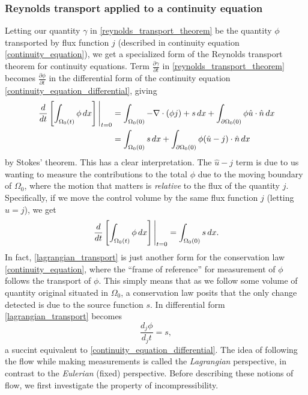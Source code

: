\documentclass[11pt,a4paper]{memoir}
\newcommand{\Part}[2]{\frac{\partial #1}{\partial #2}}
\begin{document}
\subsubsection{Reynolds transport applied to a continuity equation}
Letting our quantity $\gamma$ in \eqref{reynolds_transport_theorem} be the quantity $\phi$ transported by flux function $j$
(described in continuity equation \eqref{continuity_equation}), we get a specialized form of the Reynolds transport theorem for continuity equations.
Term $\Part{\gamma}{t}$ in \eqref{reynolds_transport_theorem} becomes $\Part{\phi}{t}$ in the differential form of the continuity equation \eqref{continuity_equation_differential}, giving
\begin{equation}\label{reynolds_transport_continuity_equation}
\begin{split}
    \eval{\frac{d}{dt}\left[\int_{\Omega_0(t)}\phi\,dx\right]}_{t=0}
        &= \int_{\Omega_0(0)}-\nabla\cdot(\phi j) + s\,dx + \int_{\partial\Omega_0(0)}\phi \hat{u}\cdot\hat{n} \,dx \\
        &= \int_{\Omega_0(0)}s\,dx + \int_{\partial\Omega_0(0)}\phi (\hat{u} - j)\cdot\hat{n} \,dx
\end{split}
\end{equation}
by Stokes' theorem. This has a clear interpretation.
The $\hat{u} - j$ term is due to us wanting to measure the contributions to the total $\phi$ due to the moving boundary of
$\Omega_0$, where the motion that matters is \textit{relative} to the flux of the quantity $j$. Specifically, if we move the control volume by
the same flux function $j$ (letting $\hat{u} = j$), we get
\begin{equation}\label{lagrangian_transport}
    \eval{\frac{d}{dt}\left[\int_{\Omega_0(t)}\phi\,dx\right]}_{t=0}
        = \int_{\Omega_0(0)}s\,dx.
\end{equation}
In fact, \eqref{lagrangian_transport} is just another form for the conservation law \eqref{continuity_equation},
where the ``frame of reference'' for measurement of $\phi$ follows the transport of $\phi$. This simply means that as we follow some volume of quantity
original situated in $\Omega_0$, a conservation law posits that the only change detected is due to the source function $s$. In differential form
\eqref{lagrangian_transport} becomes
\begin{equation}\label{lagrangian_transport_differential}
    \frac{d_j\phi}{d_j t} = s,
\end{equation}
a succint equivalent to \eqref{continuity_equation_differential}.
The idea of following the flow while making measurements is called the \textit{Lagrangian} perspective, in contrast to the \textit{Eulerian} (fixed) perspective.
Before describing these notions of flow, we first investigate the property of incompressibility.
\end{document}
